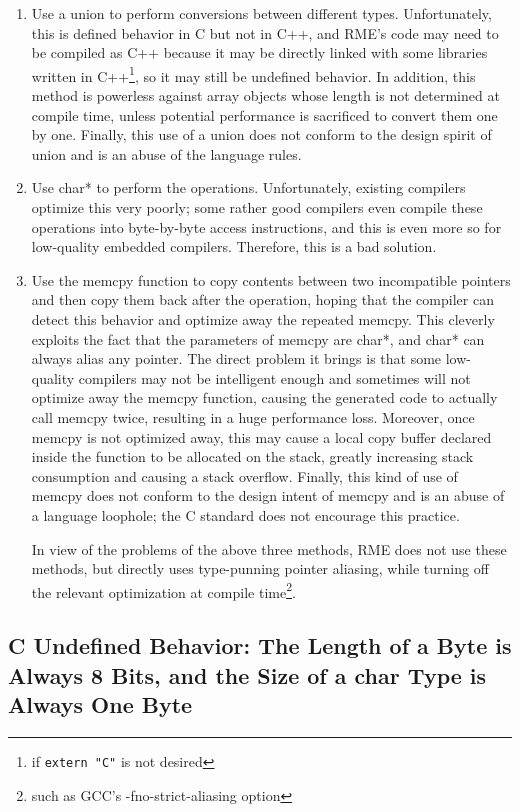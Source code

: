 \begin{enumerate}
\def\labelenumi{\arabic{enumi}.}
\item
  Use a union to perform conversions between different types. Unfortunately, this is defined behavior in C but not in C++, and RME's code may need to be compiled as C++ because it may be directly linked with some libraries written in C++\footnote{if \texttt{extern "C"} is not desired}, so it may still be undefined behavior. In addition, this method is powerless against array objects whose length is not determined at compile time, unless potential performance is sacrificed to convert them one by one. Finally, this use of a union does not conform to the design spirit of union and is an abuse of the language rules.
\item
  Use char* to perform the operations. Unfortunately, existing compilers optimize this very poorly; some rather good compilers even compile these operations into byte-by-byte access instructions, and this is even more so for low-quality embedded compilers. Therefore, this is a bad solution.
\item
  Use the memcpy function to copy contents between two incompatible pointers and then copy them back after the operation, hoping that the compiler can detect this behavior and optimize away the repeated memcpy. This cleverly exploits the fact that the parameters of memcpy are char*, and char* can always alias any pointer. The direct problem it brings is that some low-quality compilers may not be intelligent enough and sometimes will not optimize away the memcpy function, causing the generated code to actually call memcpy twice, resulting in a huge performance loss. Moreover, once memcpy is not optimized away, this may cause a local copy buffer declared inside the function to be allocated on the stack, greatly increasing stack consumption and causing a stack overflow. Finally, this kind of use of memcpy does not conform to the design intent of memcpy and is an abuse of a language loophole; the C standard does not encourage this practice.

  In view of the problems of the above three methods, RME does not use these methods, but directly uses type-punning pointer aliasing, while turning off the relevant optimization at compile time\footnote{such as GCC's -fno-strict-aliasing option}.
\end{enumerate}

\subsection{C Undefined Behavior: The Length of a Byte is Always 8 Bits, and the Size of a char Type is Always One Byte}\label{subsec:9-char-size-eight-bits}

